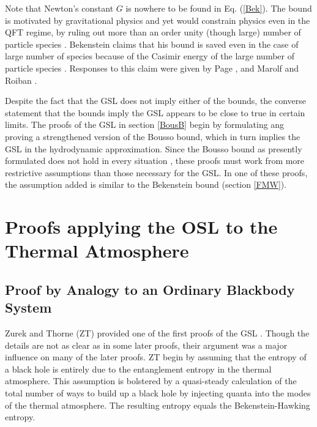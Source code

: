 \documentclass[12pt]{article}
\begin{document}
Note that Newton's constant $G$ is nowhere to be found in Eq. (\ref{Bek}).  The bound is motivated by gravitational physics and yet would constrain physics even in the QFT regime, by ruling out more than an order unity (though large) number of particle species \cite{page82}.  Bekenstein claims that his bound is saved even in the case of large number of species because of the Casimir energy of the large number of particle species \cite{bek94b}.  Responses to this claim were given by Page \cite{page04}, and Marolf and Roiban \cite{MR04}.

Despite the fact that the GSL does not imply either of the bounds, the converse statement that the bounds imply the GSL appears to be close to true in certain limits.  The proofs of the GSL in section \ref{BousB} begin by formulating ang proving a strengthened version of the Bousso bound, which in turn implies the GSL in the hydrodynamic approximation.  Since the Bousso bound as presently formulated does not hold in every situation \cite{lowe99}, these proofs must work from more restrictive assumptions than those necessary for the GSL.  In one of these proofs, the assumption added is similar to the Bekenstein bound (section \ref{FMW}).

\section{Proofs applying the OSL to the Thermal Atmosphere}\label{osl}

\subsection{Proof by Analogy to an Ordinary Blackbody System}\label{heur}

Zurek and Thorne (ZT) provided one of the first proofs of the GSL \cite{ZT85}.  Though the details are not as clear as in some later proofs, their argument was a major influence on many of the later proofs.  ZT begin by assuming that the entropy of a black hole is entirely due to the entanglement entropy in the thermal atmosphere.  This assumption is bolstered by a quasi-steady calculation of the total number of ways to build up a black hole by injecting quanta into the modes of the thermal atmosphere.  The resulting entropy equals the Bekenstein-Hawking entropy.
\end{document}
